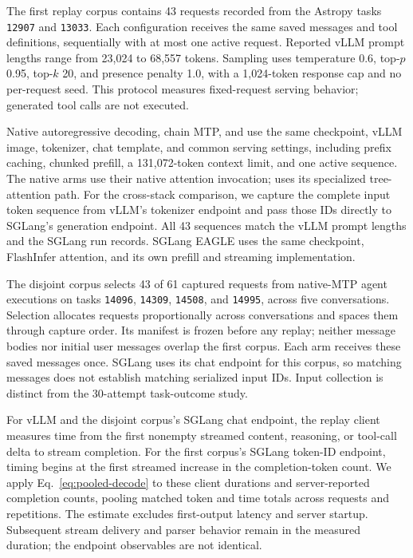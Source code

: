 The first replay corpus contains 43 requests recorded from the Astropy tasks \texttt{12907} and \texttt{13033}. Each configuration receives the same saved messages and tool definitions, sequentially with at most one active request. Reported vLLM prompt lengths range from 23,024 to 68,557 tokens. Sampling uses temperature 0.6, top-$p$ 0.95, top-$k$ 20, and presence penalty 1.0, with a 1,024-token response cap and no per-request seed. This protocol measures fixed-request serving behavior; generated tool calls are not executed.

Native autoregressive decoding, chain MTP, and \sys{} use the same checkpoint, vLLM image, tokenizer, chat template, and common serving settings, including prefix caching, chunked prefill, a 131,072-token context limit, and one active sequence. The native arms use their native attention invocation; \sys{} uses its specialized tree-attention path. For the cross-stack comparison, we capture the complete input token sequence from vLLM's tokenizer endpoint and pass those IDs directly to SGLang's generation endpoint. All 43 sequences match the vLLM prompt lengths and the SGLang run records. SGLang EAGLE uses the same checkpoint, FlashInfer attention, and its own prefill and streaming implementation.

The disjoint corpus selects 43 of 61 captured requests from native-MTP agent executions on tasks \texttt{14096}, \texttt{14309}, \texttt{14508}, and \texttt{14995}, across five conversations. Selection allocates requests proportionally across conversations and spaces them through capture order. Its manifest is frozen before any replay; neither message bodies nor initial user messages overlap the first corpus. Each arm receives these saved messages once. SGLang uses its chat endpoint for this corpus, so matching messages does not establish matching serialized input IDs. Input collection is distinct from the 30-attempt task-outcome study.

For vLLM and the disjoint corpus's SGLang chat endpoint, the replay client measures time from the first nonempty streamed content, reasoning, or tool-call delta to stream completion. For the first corpus's SGLang token-ID endpoint, timing begins at the first streamed increase in the completion-token count. We apply Eq.~\ref{eq:pooled-decode} to these client durations and server-reported completion counts, pooling matched token and time totals across requests and repetitions. The estimate excludes first-output latency and server startup. Subsequent stream delivery and parser behavior remain in the measured duration; the endpoint observables are not identical.
